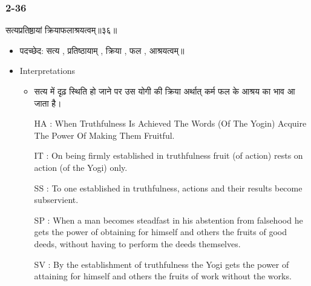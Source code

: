 \begin{frame}[fragile]\frametitle{2-36}
\begin{sanskrit}
सत्यप्रतिष्ठायां क्रियाफलाश्रयत्वम्॥३६॥
\end{sanskrit}

	\begin{itemize}
	\item पदच्छेद: सत्य , प्रतिष्ठायाम् , क्रिया , फल , आश्रयत्वम्॥
	\item Interpretations
		\begin{itemize}
		\item सत्य में दृढ़ स्थिति हो जाने पर उस योगी की क्रिया अर्थात् कर्म फल के आश्रय का भाव आ जाता है।
		\item [HA]: When Truthfulness Is Achieved The Words (Of The Yogin) Acquire The Power Of Making Them Fruitful.
		\item [IT]: On being firmly established in truthfulness fruit (of action) rests on action (of the Yogi) only.
		\item [SS]: To one established in truthfulness, actions and their results become subservient.
		\item [SP]: When a man becomes steadfast in his abstention from falsehood he gets the power of obtaining for himself and others the fruits of good deeds, without having to perform the deeds themselves.
		\item [SV]: By the establishment of truthfulness the Yogi gets the power of attaining for himself and others the fruits of work without the works. 
		\end{itemize}
	\end{itemize}	
\end{frame}

